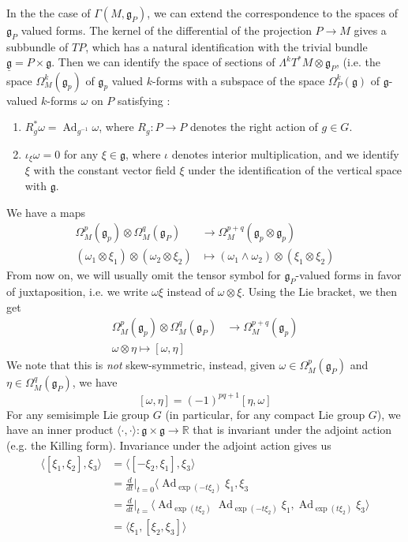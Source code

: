 \documentclass[psamsfonts, 12pt]{amsart}
\theoremstyle{definition}
\theoremstyle{remark}
\newcommand{\R}{\mathbb{R}}
\newcommand{\g}{\mathfrak{g}}
\newcommand{\inv}{^{-1}}
\DeclareMathOperator{\Ad}{Ad}
\begin{document}
In the the case of $\Gamma(M,\g_P)$, we can extend the correspondence to the spaces of
$\g_P$ valued forms. The kernel of the differential of the projection $P \to M$ gives a
subbundle of $TP$, which has a natural identification with the trivial bundle
$\underline{\g} = P \times \g$. Then we can identify the space of sections of
$\Lambda^kT^*M \otimes \g_P$, (i.e. the space $\Omega^k_M(\g_p)$ of $\g_p$ valued
$k$-forms with a subspace of the space $\Omega^k_P(\g)$ of $\g$-valued $k$-forms $\omega$
on $P$ satisfying :
\begin{enumerate}
  \item $R_g^*\omega = \Ad_{g\inv}\omega$, where $R_g : P \to P$ denotes the right
  action of $g \in G$.
  \item $\iota_\xi\omega = 0$ for any $\xi \in \g$, where $\iota$ denotes interior
  multiplication, and we identify $\xi$ with the constant vector field
  $\xi$ under the identification of the vertical space with $\g$.
\end{enumerate}
%
We have a maps
\begin{align*}
\Omega^p_M(\g_p) \otimes \Omega^q_M(\g_P) &\to \Omega^{p+q}_M(\g_p \otimes \g_p) \\
(\omega_1 \otimes \xi_1) \otimes (\omega_2 \otimes \xi_2)
&\mapsto (\omega_1 \wedge \omega_2) \otimes (\xi_1 \otimes \xi_2)
\end{align*}
From now on, we will usually omit the tensor symbol for $\g_P$-valued forms in favor of
juxtaposition, i.e. we write $\omega\xi$ instead of $\omega \otimes \xi$. Using the Lie
bracket, we then get
\begin{align*}
\Omega^p_M(\g_p) \otimes \Omega^q_M(\g_P) &\to \Omega^{p+q}_M(\g_p) \\
\omega \otimes \eta \mapsto [\omega,\eta]
\end{align*}
We note that this is \emph{not} skew-symmetric, instead, given
$\omega \in \Omega^p_M(\g_P)$  and $\eta \in \Omega^q_M(\g_P)$, we have
\[
[\omega,\eta] = (-1)^{pq+1} [\eta,\omega]
\]
For any semisimple Lie group $G$ (in particular, for any compact Lie group $G$), we have
an inner product $\langle\cdot,\cdot\rangle : \g \times \g \to \R$ that is invariant
under the adjoint action (e.g. the Killing form). Invariance under the adjoint action
gives us
\begin{align*}
\langle [\xi_1,\xi_2],\xi_3 \rangle &= \langle[-\xi_2,\xi_1],\xi_3 \rangle \\
&= \frac{d}{dt}\bigg\vert_{t=0}\langle \Ad_{\exp(-t\xi_2)}\xi_1,\xi_3 \\
&= \frac{d}{dt}\bigg\vert_{t=}\langle \Ad_{\exp(t\xi_2)}\Ad_{\exp(-t\xi_2)}\xi_1,
\Ad_{\exp(t\xi_2)}\xi_3\rangle \\
&= \langle \xi_1,[\xi_2,\xi_3]\rangle
\end{align*}
\end{document}
